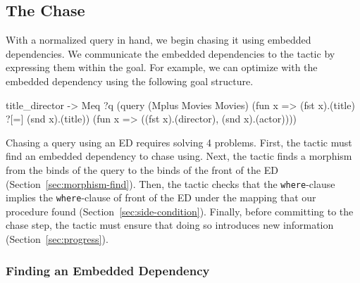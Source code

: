 \documentclass[preprint]{sigplanconf}
\begin{document}
\begin{comment}

The final result of normalization for the movies query is exactly the query presented in Section~\ref{sec:example}.
In our syntax:
\begin{coq}
query (Mplus Movies Movies)
      (fun x => (fst x).(title) ?[=] (snd x).(title))
      (fun x => ((fst x).(director), (snd x).(actor)))
\end{coq}
\end{comment}


\subsection{The Chase}
\label{sec:ltac-chase}

With a normalized query in hand, we begin chasing it using embedded dependencies.
We communicate the embedded dependencies to the tactic by expressing them within the goal.
For example, we can optimize with the  embedded dependency using the following goal structure.
\begin{coq}
title_director ->
Meq ?q (query (Mplus Movies Movies)
              (fun x => (fst x).(title) ?[=] (snd x).(title))
              (fun x => ((fst x).(director), (snd x).(actor))))
\end{coq}

Chasing a query using an ED requires solving 4 problems.
First, the tactic must find an embedded dependency to chase using.
Next, the tactic finds a morphism from the binds of the query to the binds of the front of the ED (Section~\ref{sec:morphism-find}).
Then, the tactic checks that the {\tt where}-clause implies the {\tt where}-clause of front of the ED under the mapping that our procedure found (Section~\ref{sec:side-condition}).
Finally, before committing to the chase step, the tactic must ensure that doing so introduces new information (Section~\ref{sec:progress}).

\subsubsection{Finding an Embedded Dependency}
\label{sec:traverse-ed}
\end{document}
